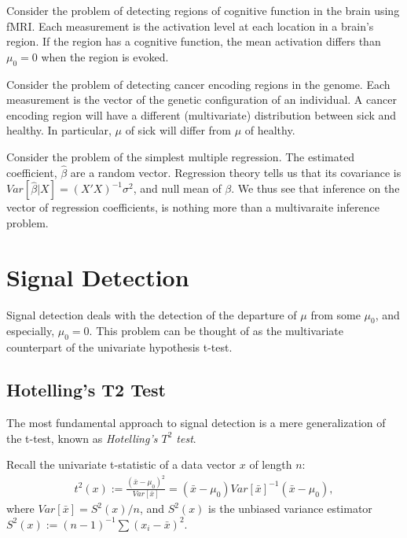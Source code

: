 \documentclass[]{book}
\theoremstyle{definition}
\theoremstyle{definition}
\theoremstyle{definition}
\theoremstyle{remark}
\let\BeginKnitrBlock\begin \let\EndKnitrBlock\end
\begin{document}
\BeginKnitrBlock{example}
\protect\hypertarget{exm:brain-imaging}{}{\label{exm:brain-imaging} }Consider the problem of detecting regions of cognitive function in the brain using fMRI.
Each measurement is the activation level at each location in a brain's region.
If the region has a cognitive function, the mean activation differs than \(\mu_0=0\) when the region is evoked.
\EndKnitrBlock{example}

\BeginKnitrBlock{example}
\protect\hypertarget{exm:genetics}{}{\label{exm:genetics} }Consider the problem of detecting cancer encoding regions in the genome.
Each measurement is the vector of the genetic configuration of an individual.
A cancer encoding region will have a different (multivariate) distribution between sick and healthy.
In particular, \(\mu\) of sick will differ from \(\mu\) of healthy.
\EndKnitrBlock{example}

\BeginKnitrBlock{example}
\protect\hypertarget{exm:regression}{}{\label{exm:regression} }Consider the problem of the simplest multiple regression.
The estimated coefficient, \(\hat \beta\) are a random vector.
Regression theory tells us that its covariance is \(Var[\hat \beta|X]=(X'X)^{-1}\sigma^2\), and null mean of \(\beta\).
We thus see that inference on the vector of regression coefficients, is nothing more than a multivaraite inference problem.
\EndKnitrBlock{example}

\hypertarget{signal-detection}{%
\section{Signal Detection}\label{signal-detection}}

Signal detection deals with the detection of the departure of \(\mu\) from some \(\mu_0\), and especially, \(\mu_0=0\).
This problem can be thought of as the multivariate counterpart of the univariate hypothesis t-test.

\hypertarget{hotellings-t2-test}{%
\subsection{Hotelling's T2 Test}\label{hotellings-t2-test}}

The most fundamental approach to signal detection is a mere generalization of the t-test, known as \emph{Hotelling's \(T^2\) test}.

Recall the univariate t-statistic of a data vector \(x\) of length \(n\):
\begin{align}
  t^2(x):= \frac{(\bar{x}-\mu_0)^2}{Var[\bar{x}]}= (\bar{x}-\mu_0)Var[\bar{x}]^{-1}(\bar{x}-\mu_0),
  \label{eq:t-test}
\end{align}
where \(Var[\bar{x}]=S^2(x)/n\), and \(S^2(x)\) is the unbiased variance estimator \(S^2(x):=(n-1)^{-1}\sum (x_i-\bar x)^2\).
\end{document}
